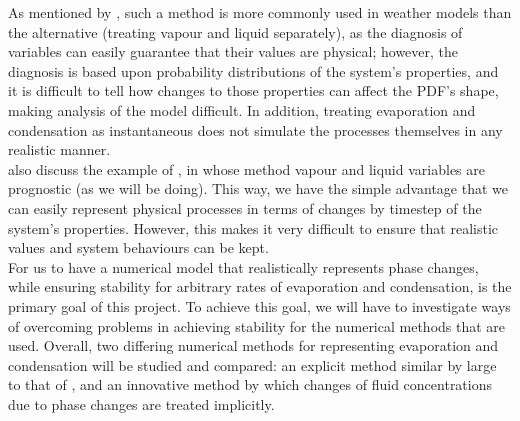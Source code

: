 \documentclass[11pt]{article}
\begin{document}
As mentioned by \citeauthor{Wilson2008}, such a method is more commonly used in weather models than the alternative (treating vapour and liquid separately), as the diagnosis of variables can easily guarantee that their values are physical; however, the diagnosis is based upon probability distributions of the system's properties, and it is difficult to tell how changes to those properties can affect the PDF's shape, making analysis of the model difficult. In addition, treating evaporation and condensation as instantaneous does not simulate the processes themselves in any realistic manner. \\
\citeauthor{Wilson2008} also discuss the example of \citet{Tiedtke1993}, in whose method vapour and liquid variables are prognostic (as we will be doing). This way, we have the simple advantage that we can easily represent physical processes in terms of changes by timestep of the system's properties. However, this makes it very difficult to ensure that realistic values and system behaviours can be kept. \\
For us to have a numerical model that realistically represents phase changes, while ensuring stability for arbitrary rates of evaporation and condensation, is the primary goal of this project. To achieve this goal, we will have to investigate ways of overcoming problems in achieving stability for the numerical methods that are used. Overall, two differing numerical methods for representing evaporation and condensation will be studied and compared: an explicit method similar by large to that of \citet{Tiedtke1993}, and an innovative method by which changes of fluid concentrations due to phase changes are treated implicitly.
\end{document}
